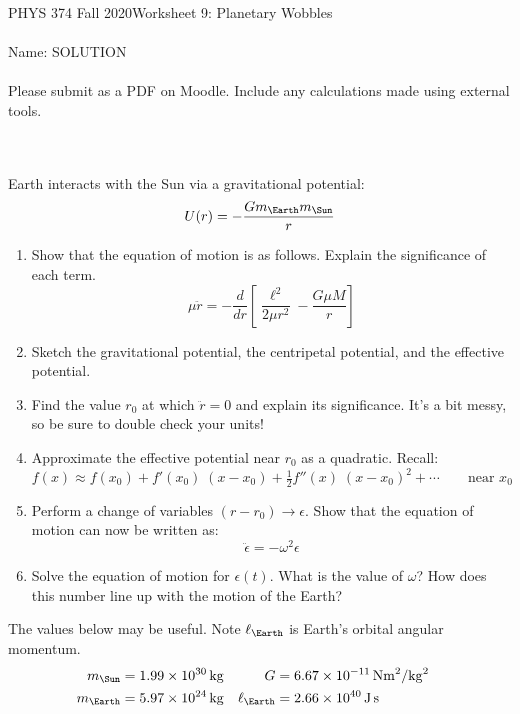 \documentclass[12pt]{article}
\newcommand{\purple}[1]{{\color{purple} #1}}
\begin{document}
PHYS 374 Fall 2020\hfill Worksheet 9: Planetary Wobbles\\
\\
Name: \purple{SOLUTION} \\
\\
Please submit as a PDF on Moodle. Include any calculations made using external tools.

\hrulefill
\\
\\
Earth interacts with the Sun via a gravitational potential:
$$
U(r) = -\frac{G m_\Earth m_\Sun}{r}
$$

\begin{enumerate}
    \item Show that the equation of motion is as follows. Explain the significance of each term.
    $$
    \mu \ddot{r} = -\frac{d}{dr} \left[ \frac{\ell^2}{2 \mu r^2} -\frac{G \mu M}{r} \right]
    $$
    \item Sketch the gravitational potential, the centripetal potential, and the effective potential.
    \item Find the value $r_0$ at which $\ddot{r}=0$ and explain its significance. It's a bit messy, so be sure to double check your units!
    \item Approximate the effective potential near $r_0$ as a quadratic. Recall:
    $$
    f(x) \approx f(x_0) + f'(x_0) \; (x - x_0) + \tfrac{1}{2} f''(x) \; (x - x_0)^2 + \cdots
    \quad\quad\text{near $x_0$}
    $$
    \item Perform a change of variables $(r - r_0) \rightarrow \epsilon$. Show that the equation of motion can now be written as:
    $$
    \ddot{\epsilon} = - \omega^2 \epsilon
    $$
    \item Solve the equation of motion for $\epsilon(t)$. What is the value of $\omega$? How does this number line up with the motion of the Earth?
\end{enumerate}

The values below may be useful. Note $\ell_\Earth$ is Earth's orbital angular momentum.
\begin{align*}
    m_\Sun &= \SI{1.99e30}{\kilo\gram} &
    G &= \SI{6.67e-11}{\newton\meter^2/\kilogram^2} & \\
    m_\Earth &= \SI{5.97e24}{\kilo\gram} & 
    \ell_\Earth &= \SI{2.66e40}{\joule \second}
\end{align*}

\newpage
\end{document}
